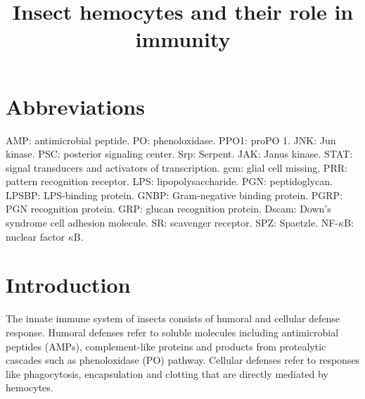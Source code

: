 \documentclass[11pt]{article}
\title{Insect hemocytes and their role in immunity}
\author{}
\date{}
\begin{document}
  \maketitle

  \linenumbers
\section{Abbreviations}
AMP: antimicrobial peptide.\newline
PO: phenoloxidase.\newline
PPO1: proPO 1.\newline
JNK: Jun kinase.\newline
PSC: posterior signaling center.\newline
Srp: Serpent.\newline
JAK: Janus kinase.\newline
STAT: signal transducers and activators of transcription.\newline
gcm: glial cell missing.\newline
PRR: pattern recognition receptor.\newline
LPS: lipopolysaccharide.\newline
PGN: peptidoglycan.\newline
LPSBP: LPS-binding protein.\newline
GNBP: Gram-negative binding protein.\newline
PGRP: PGN recognition protein.\newline
GRP: glucan recognition protein.\newline
Dscam: Down's syndrome cell adhesion molecule.\newline
SR: scavenger receptor.\newline
SPZ: Spaetzle.\newline
NF-$\kappa$B: nuclear factor $\kappa$B.\newline

\section{Introduction}
The innate immune system of insects consists of humoral and cellular defense response. 
Humoral defenses refer to soluble molecules including antimicrobial peptides (AMPs), complement-like proteins and products from protealytic cascades such as phenoloxidase (PO) pathway. 
Cellular defenses refer to responses like phagocytosis, encapsulation and clotting that are directly mediated by hemocytes.
\end{document}
